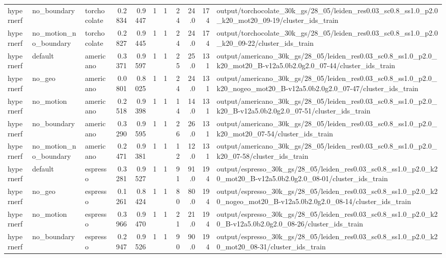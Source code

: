 \documentclass[10pt]{article}
\begin{document}
\begin{longtable}{lllrrrrrrrp{8cm}}
hypernerf & no\_boundary & torchocolate & 0.2834 & 0.9447 & 1 & 1 & 24 & 24.0 & 174 & output/torchocolate\_30k\_gs/28\_05/leiden\_res0.03\_sc0.8\_ss1.0\_p2.0\_k20\_mot20\_09-19/cluster\_ids\_train \\
hypernerf & no\_motion\_no\_boundary & torchocolate & 0.2827 & 0.9445 & 1 & 1 & 24 & 24.0 & 174 & output/torchocolate\_30k\_gs/28\_05/leiden\_res0.03\_sc0.8\_ss1.0\_p2.0\_k20\_09-22/cluster\_ids\_train \\
hypernerf & default & americano & 0.3371 & 0.9597 & 1 & 1 & 25 & 25.0 & 131 & output/americano\_30k\_gs/28\_05/leiden\_res0.03\_sc0.8\_ss1.0\_p2.0\_k20\_mot20\_B-v12a5.0b2.0g2.0\_07-44/cluster\_ids\_train \\
hypernerf & no\_geo & americano & 0.0801 & 0.8025 & 1 & 1 & 24 & 24.0 & 131 & output/americano\_30k\_gs/28\_05/leiden\_res0.03\_sc0.8\_ss1.0\_p2.0\_k20\_nogeo\_mot20\_B-v12a5.0b2.0g2.0\_07-47/cluster\_ids\_train \\
hypernerf & no\_motion & americano & 0.2518 & 0.9398 & 1 & 1 & 14 & 14.0 & 131 & output/americano\_30k\_gs/28\_05/leiden\_res0.03\_sc0.8\_ss1.0\_p2.0\_k20\_B-v12a5.0b2.0g2.0\_07-51/cluster\_ids\_train \\
hypernerf & no\_boundary & americano & 0.3290 & 0.9595 & 1 & 1 & 26 & 26.0 & 131 & output/americano\_30k\_gs/28\_05/leiden\_res0.03\_sc0.8\_ss1.0\_p2.0\_k20\_mot20\_07-54/cluster\_ids\_train \\
hypernerf & no\_motion\_no\_boundary & americano & 0.2471 & 0.9381 & 1 & 1 & 12 & 12.0 & 131 & output/americano\_30k\_gs/28\_05/leiden\_res0.03\_sc0.8\_ss1.0\_p2.0\_k20\_07-58/cluster\_ids\_train \\
hypernerf & default & espresso & 0.3281 & 0.9527 & 1 & 1 & 91 & 91.0 & 194 & output/espresso\_30k\_gs/28\_05/leiden\_res0.03\_sc0.8\_ss1.0\_p2.0\_k20\_mot20\_B-v12a5.0b2.0g2.0\_08-01/cluster\_ids\_train \\
hypernerf & no\_geo & espresso & 0.1261 & 0.8424 & 1 & 1 & 80 & 80.0 & 194 & output/espresso\_30k\_gs/28\_05/leiden\_res0.03\_sc0.8\_ss1.0\_p2.0\_k20\_nogeo\_mot20\_B-v12a5.0b2.0g2.0\_08-14/cluster\_ids\_train \\
hypernerf & no\_motion & espresso & 0.3966 & 0.9470 & 1 & 1 & 21 & 21.0 & 194 & output/espresso\_30k\_gs/28\_05/leiden\_res0.03\_sc0.8\_ss1.0\_p2.0\_k20\_B-v12a5.0b2.0g2.0\_08-26/cluster\_ids\_train \\
hypernerf & no\_boundary & espresso & 0.2947 & 0.9526 & 1 & 1 & 90 & 90.0 & 194 & output/espresso\_30k\_gs/28\_05/leiden\_res0.03\_sc0.8\_ss1.0\_p2.0\_k20\_mot20\_08-31/cluster\_ids\_train \\

\end{longtable}
\end{document}
